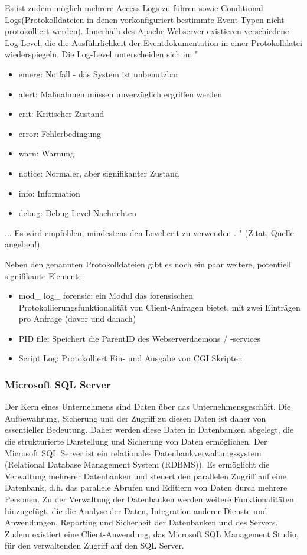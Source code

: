 Es ist zudem möglich mehrere Access-Logs zu führen sowie \glqq Conditional Logs\grqq  (Protokolldateien in denen vorkonfiguriert bestimmte Event-Typen nicht protokolliert werden). 
Innerhalb des Apache Webserver existieren verschiedene Log-Level, die die Ausführlichkeit der Eventdokumentation in einer Protokolldatei wiederspiegeln. Die Log-Level unterscheiden sich in:
"
\begin{itemize}
\item emerg: Notfall - das System ist unbenutzbar
\item alert: Maßnahmen müssen unverzüglich ergriffen werden
\item crit: Kritischer Zustand
\item error: Fehlerbedingung
\item warn: Warnung
\item notice: Normaler, aber signifikanter Zustand
\item info: Information
\item debug: Debug-Level-Nachrichten
\end{itemize}
...
Es wird empfohlen, mindestens den Level crit zu verwenden \citep{Apache2}.
" (Zitat, Quelle angeben!) %


Neben den genannten Protokolldateien gibt es noch ein paar weitere, potentiell signifikante Elemente:
\begin{itemize}
\item \glqq mod\_ log\_ forensic\grqq : ein Modul das forensischen Protokollierungsfunktionalität von Client-Anfragen bietet, mit zwei Einträgen pro Anfrage (davor und danach)
\item \glqq PID file\grqq : Speichert die ParentID des Webserverdaemons / -services
\item \glqq Script Log\grqq : Protokolliert Ein- und Ausgabe von CGI Skripten
\end{itemize}

\subsubsection{Microsoft SQL Server}
Der Kern eines Unternehmens sind Daten über das Unternehmensgeschäft. Die Aufbewahrung, Sicherung und der Zugriff zu diesen Daten ist daher von essentieller Bedeutung. Daher werden diese Daten in Datenbanken abgelegt, die die strukturierte Darstellung und Sicherung von Daten ermöglichen. Der Microsoft SQL Server ist ein relationales Datenbankverwaltungssystem (Relational Database Management System (RDBMS)). Es ermöglicht die Verwaltung mehrerer Datenbanken und steuert den parallelen Zugriff auf eine Datenbank, d.h. das parallele Abrufen und Editiern von Daten durch mehrere Personen. Zu der Verwaltung der Datenbanken werden weitere Funktionalitäten hinzugefügt, die die Analyse der Daten, Integration anderer Dienste und Anwendungen, Reporting und Sicherheit der Datenbanken und des Servers. Zudem existiert eine Client-Anwendung, das Microsoft SQL Management Studio, für den verwaltenden Zugriff auf den SQL Server.

